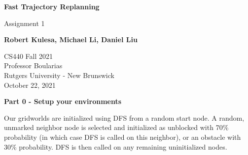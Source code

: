 \documentclass[11pt]{article}
\begin{document}
    \begin{titlepage}
        \begin{center}
            \vspace*{1cm}

            \Huge
            \textbf{Fast Trajectory Replanning}

            \vspace{0.5cm}
            \LARGE
            Assignment 1

            \vspace{1cm}

            \textbf{Robert Kulesa, Michael Li, Daniel Liu}

            \vfill


            \vspace{0.8cm}

            \Large
            CS440 Fall 2021\\
            Professor Boularias\\
            Rutgers University - New Brunswick\\
            October 22, 2021

        \end{center}
    \end{titlepage}
    \begin{center}
        \Large
        \textbf{Part 0 - Setup your environments}
    \end{center}
    \normalsize
    Our gridworlds are initialized using DFS from a random start node.
    A random, unmarked neighbor node is selected and initialized as unblocked with 70\% probability (in which case DFS is called on this neighbor), or an obstacle with 30\% probability.
    DFS is then called on any remaining uninitialized nodes.
\end{document}
